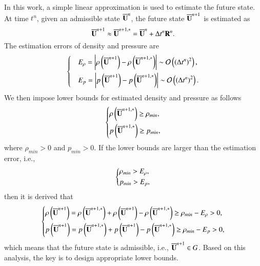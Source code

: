 In this work, a simple linear approximation is used to estimate the future state. At time $t^n$, given an admissible state $\overline{\mathbf{U}}^n$, the future state $\overline{\mathbf{U}}^{n+1}$ is estimated as
\begin{equation}
\label{eq:linear-approximation}
    \overline{\mathbf{U}}^{n+1} \approx \overline{\mathbf{U}}^{n+1,*}=\overline{\mathbf{U}}^n + \mathrm\Delta t^n \mathbf{R}^n.
\end{equation}
The estimation errors of density and pressure are
\begin{equation}
    \begin{dcases}
        &E_{\rho} = \left|\rho\left(\overline{\mathbf{U}}^{n+1}\right) - \rho\left(\overline{\mathbf{U}}^{n+1,*}\right)\right|  \sim \mathcal{O} \left(\left(\mathrm\Delta t^n\right)^2\right), \\
        &E_{p} = \left|p\left(\overline{\mathbf{U}}^{n+1}\right) - p\left(\overline{\mathbf{U}}^{n+1,*}\right)\right|  \sim \mathcal{O} \left(\left(\mathrm\Delta t^n\right)^2\right).
    \end{dcases}
\end{equation}
We then impose lower bounds for estimated density and pressure as follows
\begin{equation}
\begin{dcases}
\label{eq:impose-lower-bounds}
    \rho\left(\overline{\mathbf{U}}^{n+1,*}\right) \geq \rho_{min}, \\
    p\left(\overline{\mathbf{U}}^{n+1,*}\right) \geq p_{min},
\end{dcases}
\end{equation}
where $\rho_{min}>0$ and $p_{min}>0$. If the lower bounds are larger than the estimation error, i.e.,
\begin{equation}
    \begin{dcases}
        \rho_{min} > E_\rho, \\
        p_{min} > E_p,
    \end{dcases}
\end{equation}
then it is derived that
\begin{equation}
    \begin{dcases}
        \rho\left(\overline{\mathbf{U}}^{n+1}\right) = \rho\left(\overline{\mathbf{U}}^{n+1,*}\right) + \rho\left(\overline{\mathbf{U}}^{n+1}\right) - \rho\left(\overline{\mathbf{U}}^{n+1,*}\right) \geq \rho_{min} - E_\rho>0, \\
        p\left(\overline{\mathbf{U}}^{n+1}\right) = p\left(\overline{\mathbf{U}}^{n+1,*}\right) + p\left(\overline{\mathbf{U}}^{n+1}\right) - p\left(\overline{\mathbf{U}}^{n+1,*}\right) \geq \rho_{min} - E_p>0,
    \end{dcases}
\end{equation}
which means that the future state is admissible, i.e., $\overline{\mathbf{U}}^{n+1} \in G$. Based on this analysis, the key is to design appropriate lower bounds. 

